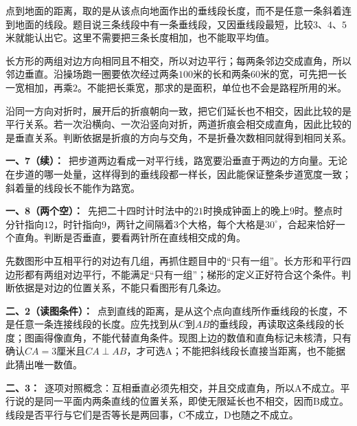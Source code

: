 \documentclass[multi=snippet,border=0pt]{standalone}
\newenvironment{snippet}[3]{\begin{minipage}{#1bp}\color{answerred}\fontsize{#2}{#3}\selectfont\raggedright}{\end{minipage}}
\begin{document}
\begin{snippet}{505}{11.5}{14}点到地面的距离，取的是从该点向地面作出的垂线段长度，而不是任意一条斜着连到地面的线段。题目说三条线段中有一条垂线段，又因垂线段最短，比较\(3\)、\(4\)、\(5\)米就能认出它。这里不需要把三条长度相加，也不能取平均值。\end{snippet}
\begin{snippet}{505}{11.5}{14}长方形的两组对边方向相同且不相交，所以对边平行；每两条邻边交成直角，所以邻边垂直。沿操场跑一圈要依次经过两条\(100\)米的长和两条\(60\)米的宽，可先把一长一宽相加，再乘\(2\)。不能把长乘宽，那求的是面积，单位也不会是路程所用的米。\end{snippet}
\begin{snippet}{505}{11.5}{14}沿同一方向对折时，展开后的折痕朝向一致，把它们延长也不相交，因此比较的是平行关系。若一次沿横向、一次沿竖向对折，两道折痕会相交成直角，因此比较的是垂直关系。判断依据是折痕的方向与交角，不是折叠次数相同就得到相同关系。\end{snippet}
\begin{snippet}{505}{11.5}{14}\textbf{一、7（续）：}\ 把步道两边看成一对平行线，路宽要沿垂直于两边的方向量。无论在步道的哪一处量，这样得到的垂线段都一样长，因此能保证整条步道宽度一致；斜着量的线段长不能作为路宽。\end{snippet}
\begin{snippet}{505}{11.5}{14}\textbf{一、8（两个空）：}\ 先把二十四时计时法中的\(21\)时换成钟面上的晚上\(9\)时。整点时分针指向\(12\)，时针指向\(9\)，两针之间隔着\(3\)个大格，每个大格是\(30^\circ\)，合起来恰好一个直角。判断是否垂直，要看两针所在直线相交成的角。\end{snippet}
\begin{snippet}{505}{11.5}{14}先数图形中互相平行的对边有几组，再抓住题目中的“只有一组”。长方形和平行四边形都有两组对边平行，不能满足“只有一组”；梯形的定义正好符合这个条件。判断依据是对边的位置关系，不能只看图形有几条边。\end{snippet}
\begin{snippet}{505}{11.5}{14}\textbf{二、2（读图条件）：}\ 点到直线的距离，是从这个点向直线所作垂线段的长度，不是任意一条连接线段的长度。应先找到从\(C\)到\(AB\)的垂线段，再读取这条线段的长度；图画得像直角，不能代替直角条件。现图上边的数值和直角标记未核清，只有确认\(CA=3\)厘米且\(CA\perp AB\)，才可选A；不能把斜线段长直接当距离，也不能据此猜出唯一数值。\end{snippet}
\begin{snippet}{505}{11.5}{14}\textbf{二、3：}\ 逐项对照概念：互相垂直必须先相交，并且交成直角，所以A不成立。平行说的是同一平面内两条直线的位置关系，即使无限延长也不相交，因而B成立。线段是否平行与它们是否等长是两回事，C不成立，D也随之不成立。\end{snippet}
\end{document}
